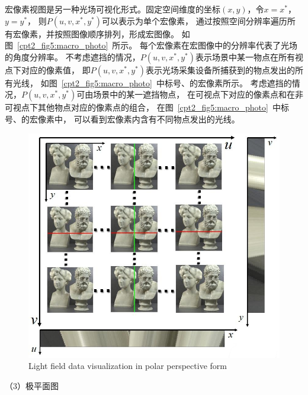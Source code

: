 宏像素视图是另一种光场可视化形式。固定空间维度的坐标$(x, y)$，令$x=x^{*}$，$y=y^{*}$，
则$ P(u, v, x^{*}, y^{*})$可以表示为单个宏像素，
通过按照空间分辨率遍历所有宏像素，并按照图像顺序排列，形成宏图像。
如图~\ref{cpt2_fig5:macro_photo}~所示。
每个宏像素在宏图像中的分辨率代表了光场的角度分辨率。
%
不考虑遮挡的情况，$ P(u, v, x^{*}, y^{*})$表示场景中某一物点在所有视点下对应的像素值，
即$ P(u, v, x^{*}, y^{*})$表示光场采集设备所捕获到的物点发出的所有光线，
如图~\ref{cpt2_fig5:macro_photo}~中标号、的宏像素所示。
考虑遮挡的情况，$ P(u, v, x^{*}, y^{*})$可由场景中的某一遮挡物点，
在可视点下对应的像素点和在非可视点下其他物点对应的像素点的组合，
在图~\ref{cpt2_fig5:macro_photo}~中标号、的宏像素中，
可以看到宏像素内含有不同物点发出的光线。\par
%
%
%
%
%
\begin{figure}[!ht]
	\centering
	\includegraphics[width=0.75\linewidth]{figures/chapter2/epi_photos}
	{Light field data visualization in polar perspective form}  
	\label{cpt2_fig6:epi_photos}
\end{figure}
%
%
%







（3）极平面图





